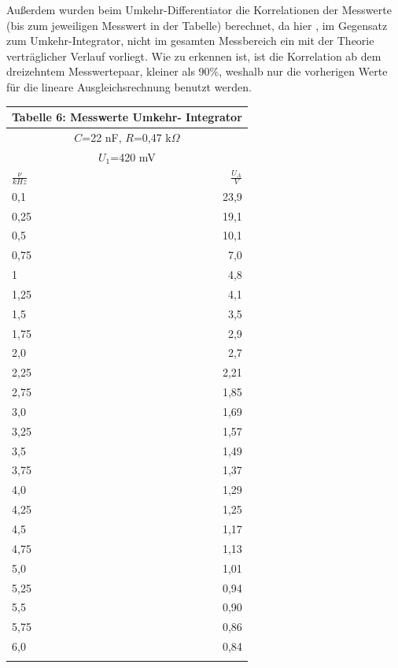 \documentclass{scrartcl}
\begin{document}
Außerdem wurden beim Umkehr-Differentiator die Korrelationen der Messwerte (bis zum jeweiligen Messwert in der Tabelle) berechnet, da hier , im Gegensatz zum Umkehr-Integrator, nicht im gesamten Messbereich ein mit der Theorie verträglicher Verlauf vorliegt.
Wie zu erkennen ist, ist die Korrelation ab dem dreizehntem Messwertepaar, kleiner als 90\%, weshalb nur die vorherigen Werte für die lineare Ausgleichsrechnung benutzt werden.
\


\iffalse
 \begin{minipage}{0.6\textwidth}
\begin{tabular}{@{}l|r@{}}
 \multicolumn{2}{c}{Tabelle 6: Messwerte Umkehr- Integrator} \\

    \toprule
     \multicolumn{2}{c}{$C$=22 nF, $R$=0,47 k$\Omega$} \\
     \multicolumn{2}{c}{$U_1$=420 mV} \\
     \cmidrule(r){1-2}
    $\frac{\nu}{kHz}$ & $\frac{U_A}{V}$ \\
    \midrule
       0,1 & 23,9  \\
     0,25 & 19,1  \\
     0,5 & 10,1 \\
     0,75 & 7,0 \\
     1 & 4,8  \\
     1,25 & 4,1 \\
     1,5 & 3,5 \\
     1,75 & 2,9 \\
     2,0 & 2,7 \\
     2,25 & 2,21 \\
     2,75 & 1,85 \\
     3,0 & 1,69 \\
     3,25 & 1,57 \\
     3,5 & 1,49 \\
     3,75 & 1,37 \\
     4,0 & 1,29 \\
     4,25 & 1,25 \\
     4,5 & 1,17 \\
     4,75 & 1,13 \\
     5,0 & 1,01 \\
     5,25 & 0,94 \\
     5,5 & 0,90 \\
     5,75 & 0,86 \\
     6,0 & 0,84 \\
     			\\
     \bottomrule

\end{tabular}

\end{minipage}
\end{document}
